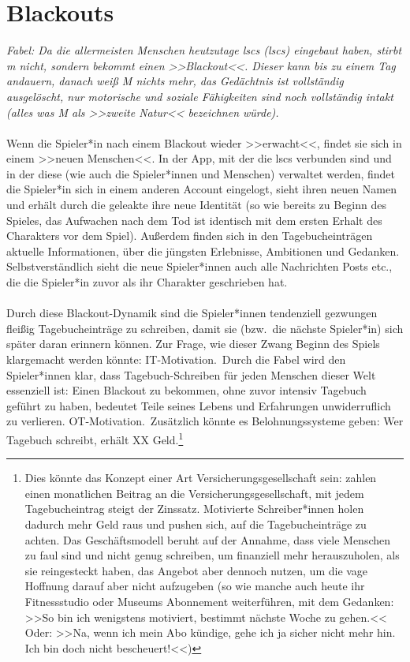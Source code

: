 \section{Blackouts}\label{sec:blackouts}

\emph{Fabel: Da die allermeisten Menschen heutzutage \aclp{lsc}
(\ac{lsc}s) eingebaut haben, stirbt \ac{m} nicht, sondern bekommt einen
>>Blackout<<.
Dieser kann bis zu einem Tag andauern, danach weiß M nichts mehr, das
Gedächtnis ist vollständig ausgelöscht, nur motorische und soziale Fähigkeiten
sind noch vollständig intakt (alles was M als >>zweite Natur<< bezeichnen
würde).}\\\\
%
Wenn die Spieler*in nach einem Blackout wieder >>erwacht<<, findet sie sich in einem 
>>neuen Menschen<<. 
In der App, mit der die \ac{lsc}s verbunden sind und in der diese (wie auch die 
Spieler*innen und Menschen) verwaltet werden, findet die Spieler*in sich in
einem anderen Account eingelogt, sieht ihren neuen Namen und erhält durch die
geleakte  ihre neue Identität (so wie bereits zu Beginn des
Spieles, das Aufwachen nach dem Tod ist identisch mit dem ersten Erhalt des
Charakters vor dem Spiel). 
Außerdem finden sich in den Tagebucheinträgen aktuelle Informationen, über die
jüngsten Erlebnisse, Ambitionen und Gedanken. 
Selbstverständlich sieht die neue Spieler*innen auch alle Nachrichten Posts
etc., die die Spieler*in zuvor als ihr Charakter geschrieben hat.\\\\
%
Durch diese Blackout-Dynamik sind die Spieler*innen tendenziell gezwungen
fleißig Tagebucheinträge zu schreiben, damit sie (bzw.~die nächste Spieler*in) sich 
später daran erinnern können. 
Zur Frage, wie dieser Zwang Beginn des Spiels klargemacht werden könnte:
IT-Motivation.~Durch die Fabel wird den Spieler*innen klar, dass
Tagebuch-Schreiben für jeden Menschen dieser Welt essenziell ist: Einen Blackout
zu bekommen, ohne zuvor intensiv Tagebuch geführt zu haben, bedeutet Teile
seines Lebens und Erfahrungen unwiderruflich zu verlieren.
OT-Motivation.~Zusätzlich könnte es Belohnungssysteme geben: Wer Tagebuch
schreibt, erhält XX Geld.\footnote{
  Dies könnte das Konzept einer Art Versicherungsgesellschaft sein:
   zahlen einen monatlichen Beitrag an die
  Versicherungsgesellschaft, mit jedem Tagebucheintrag steigt der Zinssatz.
  Motivierte Schreiber*innen holen dadurch mehr Geld raus und pushen sich, auf
  die Tagebucheinträge zu achten. 
  Das Geschäftsmodell beruht auf der Annahme, dass viele Menschen zu
  faul sind und nicht genug schreiben, um finanziell mehr herauszuholen, als sie
  reingesteckt haben, das Angebot aber dennoch nutzen, um die vage Hoffnung
  darauf aber nicht aufzugeben (so wie manche auch heute ihr Fitnessstudio oder
  Museums Abonnement weiterführen, mit dem Gedanken: >>So bin ich wenigstens
  motiviert, bestimmt nächste Woche zu gehen.<< Oder: >>Na, wenn ich mein Abo
  kündige, gehe ich ja sicher nicht mehr hin. Ich bin doch nicht bescheuert!<<)
}
